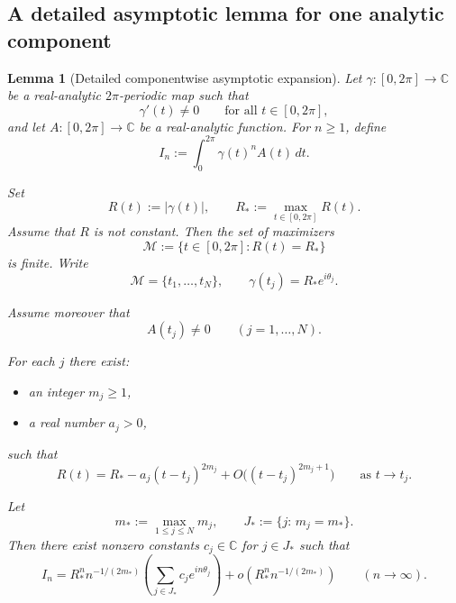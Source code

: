 \documentclass[11pt]{amsart}
\newtheorem{lemma}[theorem]{Lemma}
\theoremstyle{remark}
\newcommand{\C}{\mathbb C}
\newcommand{\1}{\mathbf 1}
\begin{document}
\subsection{A detailed asymptotic lemma for one analytic component}

\begin{lemma}[Detailed componentwise asymptotic expansion]\label{lem:component-asymptotic-detailed}
Let $\gamma:[0,2\pi]\to\C$ be a real-analytic $2\pi$-periodic map such that
\[
\gamma'(t)\neq 0
\qquad\text{for all }t\in[0,2\pi],
\]
and let $A:[0,2\pi]\to\C$ be a real-analytic function. For $n\ge 1$, define
\[
I_n:=\int_0^{2\pi}\gamma(t)^nA(t)\,dt.
\]

Set
\[
R(t):=|\gamma(t)|,
\qquad
R_*:=\max_{t\in[0,2\pi]}R(t).
\]
Assume that $R$ is not constant. Then the set of maximizers
\[
\mathcal M:=\{t\in[0,2\pi]:R(t)=R_*\}
\]
is finite. Write
\[
\mathcal M=\{t_1,\dots,t_N\},
\qquad
\gamma(t_j)=R_*e^{i\theta_j}.
\]

Assume moreover that
\[
A(t_j)\neq 0
\qquad (j=1,\dots,N).
\]

For each $j$ there exist:
\begin{itemize}
\item an integer $m_j\ge 1$,
\item a real number $a_j>0$,
\end{itemize}
such that
\begin{equation}\label{eq:R-expansion}
R(t)=R_* - a_j (t-t_j)^{2m_j} + O\!\bigl((t-t_j)^{2m_j+1}\bigr)
\qquad\text{as }t\to t_j.
\end{equation}

Let
\[
m_*:=\max_{1\le j\le N}m_j,
\qquad
J_*:=\{j:\,m_j=m_*\}.
\]
Then there exist nonzero constants $c_j\in\C$ for $j\in J_*$ such that
\begin{equation}\label{eq:full-asymptotic}
I_n
=
R_*^n n^{-1/(2m_*)}
\left(
\sum_{j\in J_*} c_j e^{in\theta_j}
\right)
+
o\!\left(R_*^n n^{-1/(2m_*)}\right)
\qquad (n\to\infty).
\end{equation}
\end{lemma}
\end{document}
